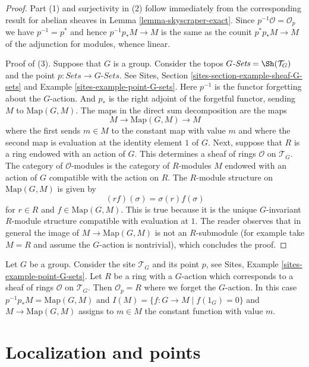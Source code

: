 \begin{proof}
Part (1) and surjectivity in (2)
follow immediately from the corresponding result for abelian
sheaves in
Lemma \ref{lemma-skyscraper-exact}.
Since $p^{-1}\mathcal{O} = \mathcal{O}_p$
we have $p^{-1} = p^*$ and hence $p^{-1}p_*M \to M$
is the same as the counit $p^*p_*M \to M$
of the adjunction for modules, whence linear.

\medskip\noindent
Proof of (3). Suppose that $G$ is a group. Consider the topos
$G\textit{-Sets} = \Sh(\mathcal{T}_G)$
and the point $p : \textit{Sets} \to G\textit{-Sets}$.
See Sites, Section \ref{sites-section-example-sheaf-G-sets} and
Example \ref{sites-example-point-G-sets}.
Here $p^{-1}$ is the functor forgetting
about the $G$-action. And $p_*$ is the right adjoint
of the forgetful functor, sending $M$ to $\text{Map}(G, M)$.
The maps in the direct sum decomposition are the maps
$$
M \to \text{Map}(G, M) \to M
$$
where the first sends $m \in M$ to the constant map with value $m$ and
where the second map is evaluation at the identity element $1$ of $G$.
Next, suppose that $R$ is a ring endowed with an action of $G$.
This determines a sheaf of rings $\mathcal{O}$ on $\mathcal{T}_G$.
The category of $\mathcal{O}$-modules is the category of $R$-modules $M$
endowed with an action of $G$ compatible with the action on $R$.
The $R$-module structure on $\text{Map}(G, M)$ is given by
$$
( r f ) (\sigma) = \sigma(r) f(\sigma)
$$
for $r \in R$ and $f \in \text{Map}(G, M)$. This is true because it is the
unique $G$-invariant $R$-module structure compatible with evaluation at $1$.
The reader observes that in general the image of $M \to \text{Map}(G, M)$
is not an $R$-submodule (for example take $M = R$ and assume the
$G$-action is nontrivial), which concludes the proof.
\end{proof}

\begin{example}
\label{example-ring-with-group-action}
Let $G$ be a group. Consider the site
$\mathcal{T}_G$ and its point $p$, see
Sites, Example \ref{sites-example-point-G-sets}.
Let $R$ be a ring with a $G$-action which corresponds to
a sheaf of rings $\mathcal{O}$ on $\mathcal{T}_G$.
Then $\mathcal{O}_p = R$ where we forget the $G$-action.
In this case $p^{-1}p_*M = \text{Map}(G, M)$ and
$I(M) = \{f : G \to M \mid f(1_G) = 0\}$ and
$M \to \text{Map}(G, M)$ assigns to $m \in M$ the constant
function with value $m$.
\end{example}




\section{Localization and points}
\label{section-localize-points}

